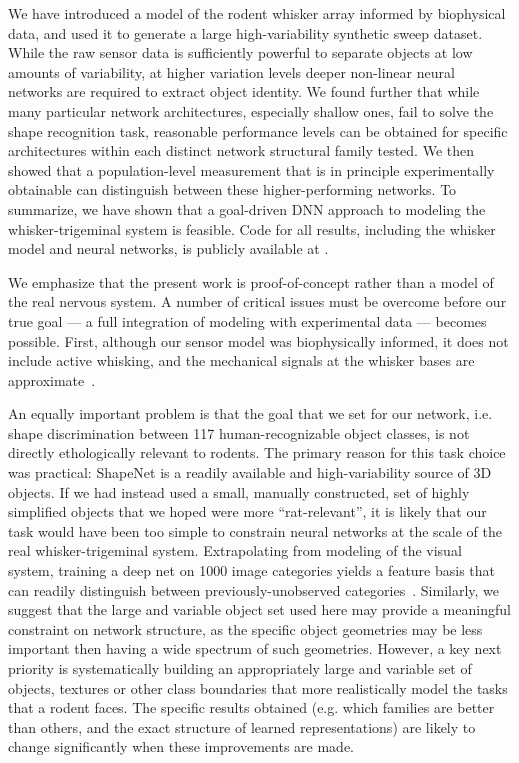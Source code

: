 We have introduced a model of the rodent whisker array informed by biophysical data, and used it to generate a large high-variability synthetic sweep dataset. 
While the raw sensor data is sufficiently powerful to separate objects at low amounts of variability, at higher variation levels deeper non-linear neural networks are required to extract object identity. 
We found further that while many particular network architectures, especially shallow ones, fail to solve the shape recognition task, reasonable performance levels can be obtained for specific architectures within each distinct network structural family tested.
We then showed that a population-level measurement that is in principle experimentally obtainable can distinguish between these higher-performing networks. 
To summarize, we have shown that a goal-driven DNN approach to modeling the whisker-trigeminal system is feasible. 
Code for all results, including the whisker model and neural networks, is publicly available at \WEBSITE.

We emphasize that the present work is proof-of-concept rather than a model of the real nervous system.
A number of critical issues must be overcome before our true goal --- a full integration of modeling with experimental data --- becomes possible.    
First, although our sensor model was biophysically informed, it does not include active whisking, and the mechanical signals at the whisker bases are approximate~\cite{Quist2014, Huet2016}.

An equally important problem is that the goal that we set for our network, i.e. shape discrimination between 117 human-recognizable object classes, is not directly ethologically relevant to rodents. 
The primary reason for this task choice was practical: ShapeNet is a readily available and high-variability source of 3D objects. 
If we had instead used a small, manually constructed, set of highly simplified objects that we hoped were more ``rat-relevant'', it is likely that our task would have been too simple to constrain neural networks at the scale of the real whisker-trigeminal system. 
Extrapolating from modeling of the visual system, training a deep net on 1000 image categories yields a feature basis that can readily distinguish between previously-unobserved categories~\cite{Yamins2014,cadieu2014deep,razavian2014cnn}.
Similarly, we suggest that the large and variable object set used here may provide a meaningful constraint on network structure, as the specific object geometries may be less important then having a wide spectrum of such geometries. 
However, a key next priority is systematically building an appropriately large and variable set of objects, textures or other class boundaries that more realistically model the tasks that a rodent faces.
The specific results obtained (e.g. which families are better than others, and the exact structure of learned representations) are likely to change significantly when these improvements are made.  

